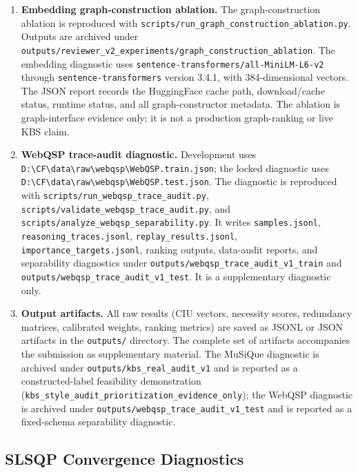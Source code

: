 \documentclass[a4paper,fleqn]{cas-sc}
\begin{document}
\begin{enumerate}
\item \textbf{Embedding graph-construction ablation.} The graph-construction ablation is reproduced with \texttt{scripts/run\_graph\_construction\_ablation.py}. Outputs are archived under \texttt{outputs/reviewer\_v2\_experiments/graph\_construction\_ablation}. The embedding diagnostic uses \texttt{sentence-transformers/all-MiniLM-L6-v2} through \texttt{sentence-transformers} version 3.4.1, with 384-dimensional vectors. The JSON report records the HuggingFace cache path, download/cache status, runtime status, and all graph-constructor metadata. The ablation is graph-interface evidence only; it is not a production graph-ranking or live KBS claim.
\item \textbf{WebQSP trace-audit diagnostic.} Development uses \texttt{D:\textbackslash CF\textbackslash data\textbackslash raw\textbackslash webqsp\textbackslash WebQSP.train.json}; the locked diagnostic uses \texttt{D:\textbackslash CF\textbackslash data\textbackslash raw\textbackslash webqsp\textbackslash WebQSP.test.json}. The diagnostic is reproduced with \texttt{scripts/run\_webqsp\_trace\_audit.py}, \texttt{scripts/validate\_webqsp\_trace\_audit.py}, and \texttt{scripts/analyze\_webqsp\_separability.py}. It writes \texttt{samples.jsonl}, \texttt{reasoning\_traces.jsonl}, \texttt{replay\_results.jsonl}, \texttt{importance\_targets.jsonl}, ranking outputs, data-audit reports, and separability diagnostics under \texttt{outputs/webqsp\_trace\_audit\_v1\_train} and \texttt{outputs/webqsp\_trace\_audit\_v1\_test}. It is a supplementary diagnostic only.
\item \textbf{Output artifacts.} All raw results (CIU vectors, necessity scores, redundancy matrices, calibrated weights, ranking metrics) are saved as JSONL or JSON artifacts in the \texttt{outputs/} directory. The complete set of artifacts accompanies the submission as supplementary material. The MuSiQue diagnostic is archived under \texttt{outputs/kbs\_real\_audit\_v1} and is reported as a constructed-label feasibility demonstration (\texttt{kbs\_style\_audit\_prioritization\_evidence\_only}); the WebQSP diagnostic is archived under \texttt{outputs/webqsp\_trace\_audit\_v1\_test} and is reported as a fixed-schema separability diagnostic.
\end{enumerate}

\subsection{SLSQP Convergence Diagnostics}
\label{app:slsqp-diagnostics}
\end{document}
